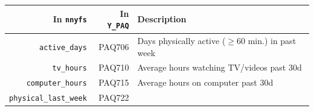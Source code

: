 \documentclass[
]{book}
\begin{document}
\begin{longtable}[]{@{}rrl@{}}
\toprule
\begin{minipage}[b]{0.20\columnwidth}\raggedleft
In \texttt{nnyfs}\strut
\end{minipage} & \begin{minipage}[b]{0.16\columnwidth}\raggedleft
In \texttt{Y\_PAQ}\strut
\end{minipage} & \begin{minipage}[b]{0.55\columnwidth}\raggedright
Description\strut
\end{minipage}\tabularnewline
\midrule
\endhead
\begin{minipage}[t]{0.20\columnwidth}\raggedleft
\texttt{active\_days}\strut
\end{minipage} & \begin{minipage}[t]{0.16\columnwidth}\raggedleft
PAQ706\strut
\end{minipage} & \begin{minipage}[t]{0.55\columnwidth}\raggedright
Days physically active (\(\geq 60\) min.) in past week\strut
\end{minipage}\tabularnewline
\begin{minipage}[t]{0.20\columnwidth}\raggedleft
\texttt{tv\_hours}\strut
\end{minipage} & \begin{minipage}[t]{0.16\columnwidth}\raggedleft
PAQ710\strut
\end{minipage} & \begin{minipage}[t]{0.55\columnwidth}\raggedright
Average hours watching TV/videos past 30d\strut
\end{minipage}\tabularnewline
\begin{minipage}[t]{0.20\columnwidth}\raggedleft
\texttt{computer\_hours}\strut
\end{minipage} & \begin{minipage}[t]{0.16\columnwidth}\raggedleft
PAQ715\strut
\end{minipage} & \begin{minipage}[t]{0.55\columnwidth}\raggedright
Average hours on computer past 30d\strut
\end{minipage}\tabularnewline
\begin{minipage}[t]{0.20\columnwidth}\raggedleft
\texttt{physical\_last\_week}\strut
\end{minipage} & \begin{minipage}[t]{0.16\columnwidth}\raggedleft
PAQ722\strut
\end{minipage} & \begin{minipage}[t]{0.55\columnwidth}\raggedright

\end{minipage}
\end{longtable}
\end{document}

